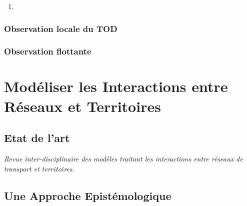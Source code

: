 \begin{enumerate}
	\item 
\end{enumerate}


\subsubsection{Observation locale du TOD}



\subsubsection{Observation flottante}






\section{Modéliser les Interactions entre Réseaux et Territoires}


\subsection{Etat de l'art}

\textit{Revue inter-disciplinaire des modèles traitant les interactions entre réseaux de transport et territoires.}


\subsection{Une Approche Epistémologique}






